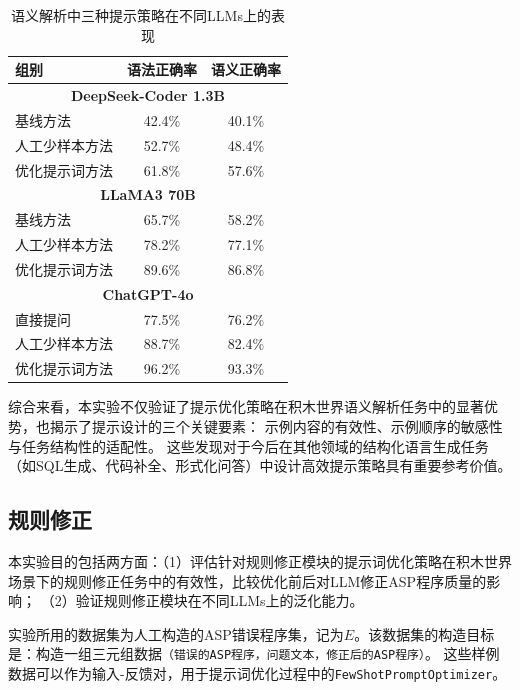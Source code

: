 \begin{table}[h]
    \centering
    \begin{tabular}{lcc}
        \toprule
        \textbf{组别} & \textbf{语法正确率} & \textbf{语义正确率} \\
        \midrule
        \multicolumn{3}{c}{\textbf{DeepSeek-Coder 1.3B}} \\
        基线方法 & 42.4\% & 40.1\%\\
        人工少样本方法 & 52.7\% & 48.4\% \\
        优化提示词方法 & 61.8\% & 57.6\% \\
        \midrule
        \multicolumn{3}{c}{\textbf{LLaMA3 70B}} \\
        基线方法 & 65.7\% & 58.2\% \\
        人工少样本方法 & 78.2\% & 77.1\% \\
        优化提示词方法 & 89.6\% & 86.8\% \\
        \midrule
        \multicolumn{3}{c}{\textbf{ChatGPT-4o}} \\
        直接提问 & 77.5\% & 76.2\% \\
        人工少样本方法 & 88.7\% & 82.4\% \\
        优化提示词方法 & 96.2\% & 93.3\% \\
        \bottomrule
    \end{tabular}
    \caption{语义解析中三种提示策略在不同LLMs上的表现}
    \label{tab:semantic-result}
\end{table}

综合来看，本实验不仅验证了提示优化策略在积木世界语义解析任务中的显著优势，也揭示了提示设计的三个关键要素：
示例内容的有效性、示例顺序的敏感性与任务结构性的适配性。
这些发现对于今后在其他领域的结构化语言生成任务（如SQL生成、代码补全、形式化问答）中设计高效提示策略具有重要参考价值。
\subsection{规则修正}
本实验目的包括两方面：（1）评估针对规则修正模块的提示词优化策略在积木世界场景下的规则修正任务中的有效性，比较优化前后对LLM修正ASP程序质量的影响；
（2）验证规则修正模块在不同LLMs上的泛化能力。

实验所用的数据集为人工构造的ASP错误程序集，记为$E$。该数据集的构造目标是：构造一组三元组数据\texttt{（错误的ASP程序，问题文本，修正后的ASP程序）}。
这些样例数据可以作为输入-反馈对，用于提示词优化过程中的\texttt{FewShotPromptOptimizer}。

